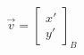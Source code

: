\documentclass[preview]{standalone}
\begin{document}
\begin{align*}
\vec{v} = \begin{bmatrix} x' \\ y' \end{bmatrix}_B
\end{align*}
\end{document}
